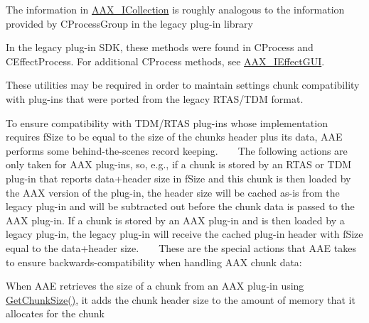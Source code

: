 \begin{DoxyRefList}
\item[Class \mbox{\hyperlink{a02212}{AAX\+\_\+\+ICollection}} ]\label{a00880__porting_notes000037}%
%
 The information in \mbox{\hyperlink{a02212}{AAX\+\_\+\+ICollection}} is roughly analogous to the information provided by CProcess\+Group in the legacy plug-\/in library 
\item[Class \mbox{\hyperlink{a02268}{AAX\+\_\+\+IEffect\+Parameters}} ]\label{a00880__porting_notes000038}%
%
 In the legacy plug-\/in SDK, these methods were found in CProcess and {\ttfamily CEffect\+Process}. For additional {\ttfamily CProcess} methods, see \mbox{\hyperlink{a02264}{AAX\+\_\+\+IEffect\+GUI}}. 
\item[File \mbox{\hyperlink{a00752}{AAX\+\_\+\+Slider\+Conversions.h}} ]\label{a00880__porting_notes000059}%
%
 These utilities may be required in order to maintain settings chunk compatibility with plug-\/ins that were ported from the legacy RTAS/\+TDM format. 
\item[Class \mbox{\hyperlink{a01780}{AAX\+\_\+\+SPlug\+In\+Chunk\+Header}} ]\label{a00880__porting_notes000002}%
%
 To ensure compatibility with TDM/\+RTAS plug-\/ins whose implementation requires {\ttfamily f\+Size} to be equal to the size of the chunk\textquotesingle{}s header plus its data, AAE performs some behind-\/the-\/scenes record keeping. ~\newline
 ~\newline
 The following actions are only taken for AAX plug-\/ins, so, e.\+g., if a chunk is stored by an RTAS or TDM plug-\/in that reports data+header size in {\ttfamily f\+Size} and this chunk is then loaded by the AAX version of the plug-\/in, the header size will be cached as-\/is from the legacy plug-\/in and will be subtracted out before the chunk data is passed to the AAX plug-\/in. If a chunk is stored by an AAX plug-\/in and is then loaded by a legacy plug-\/in, the legacy plug-\/in will receive the cached plug-\/in header with {\ttfamily f\+Size} equal to the data+header size. ~\newline
 ~\newline
 These are the special actions that AAE takes to ensure backwards-\/compatibility when handling AAX chunk data\+:
\begin{DoxyItemize}
\item When AAE retrieves the size of a chunk from an AAX plug-\/in using \mbox{\hyperlink{a02068_aa986711cd372febcaae803e86ae08f63}{Get\+Chunk\+Size()}}, it adds the chunk header size to the amount of memory that it allocates for the chunk ~\newline


\end{DoxyItemize}
\end{DoxyRefList}
